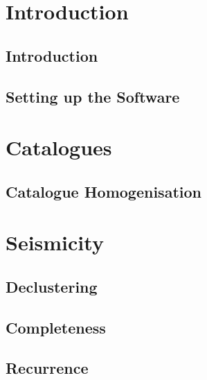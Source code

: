 \documentclass[11pt,a4paper,headings=small,dvips]{scrbook}
\begin{document}
\part{Introduction}
\chapter{Introduction}
	
	
\chapter{Setting up the Software}
  
  
\part{Catalogues}
\chapter{Catalogue Homogenisation}
	

\part{Seismicity}
\chapter{Declustering}
  \label{chap: declustering}
  
  
\chapter{Completeness}
  \label{chap: completeness}
  

\chapter{Recurrence}
  \label{chap: recurrence}
  
\end{document}
